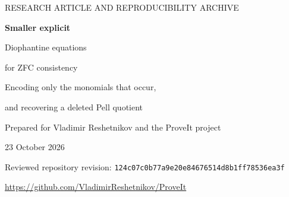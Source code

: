 \documentclass[11pt,a4paper]{article}
\newcommand{\pin}{\texttt{124c07c0b77a9e20e84676514d8b1ff78536ea3f}}
\theoremstyle{definition}
\theoremstyle{remark}
\numberwithin{equation}{section}
\begin{document}
\hypersetup{pageanchor=false}
\begin{titlepage}
\vspace*{18mm}
{\small\sffamily\color{blue!45!black} RESEARCH ARTICLE AND REPRODUCIBILITY ARCHIVE}\par
\vspace{9mm}
{\Huge\bfseries Smaller explicit\par Diophantine equations\par for ZFC consistency}\par
\vspace{9mm}
{\Large Encoding only the monomials that occur,\par and recovering a deleted Pell quotient}\par
\vspace{9mm}
{\large Prepared for Vladimir Reshetnikov and the ProveIt project\par
23 October 2026}
\vspace{10mm}
\begin{abstract}
We construct explicit integer-coefficient polynomials whose absence of
zeros, on precisely specified domains, is equivalent to syntactic
consistency of ZFC through the repository's calibrated blank-K215 compiler.
The comparison includes the eight wave-6 reports at the pinned revision,
not just the older collection summary. A support-dependent quadratic
encoding lowers the nine-positive-variable degree from $129\,875\,980$
to $30\,947\,584$, with 651 binary arithmetic operations instead of 788.
Its ten-unrestricted-integer companion has degree $56\,593\,864$ and
653 operations, versus $237\,520\,456$ and 782. The general ten-integer
reduction is Sun's; the contribution is the smaller explicit source
encoding and its specialization.

A separate construction uses eleven positive variables, degree 954,
and 115 operations. It combines a refined auxiliary-root estimate with
a midpoint carrier and the modulus $4q^4$, which recovers the deleted
index quotient without a translation of the scale variable. A lower-degree
fourteen-positive-variable alternative retains degree 56 with 79 operations,
removing one variable from the historical degree-56 construction.
All constants are fixed
by finite recipes and binary payloads; no consistency-dependent choice
or unspecified enumeration index occurs. The archive contains the
literal circuits, complete new reduction proofs, exact finite certificates,
and preserved source notices. The inherited compiler calibration and
number-theoretic interfaces are identified explicitly. This is an ordinary
mathematical construction, not a new end-to-end Lean certificate or a
proof of global minimality.
\end{abstract}
\vfill
{\small Reviewed repository revision: \pin\par
\url{https://github.com/VladimirReshetnikov/ProveIt}}
\end{titlepage}
\hypersetup{pageanchor=true}
\tableofcontents
\clearpage
{}
\end{document}
